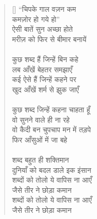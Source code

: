 \begin{verse}[\versewidth]
{“चिपके गाल वज़न कम\\
कमज़ोर हो गये हो”\\
ऐसी बातें सुन अच्छा होते\\
मरीज़ को फिर से बीमार बनायें\\
\\
कुछ शब्द हैं जिन्हें बिन कहे\\
लब आँखें बेहतर समझाएँ\\
कई ऐसे हैं जिन्हें कहने पर\\
खुद आँखें शर्म से झुक जाएँ\\
\\
कुछ शब्द जिन्हें कहना चाहता हूँ\\
वो सुनने वाले ही ना रहे\\
वो कैदी बन चुपचाप मन में तड़पे\\
फिर आँसुओं में जा बहे\\
\\
शब्द बहुत ही शक्तिमान\\
दुनियाँ को बदल डाले इक इंसान\\
शब्दों को तोलो ये वापिस ना आएँ\\
जैसे तीर ने छोड़ा कमान\\
शब्दों को तोलो ये वापिस ना आएँ\\
जैसे तीर ने छोड़ा कमान
}
\end{verse}

